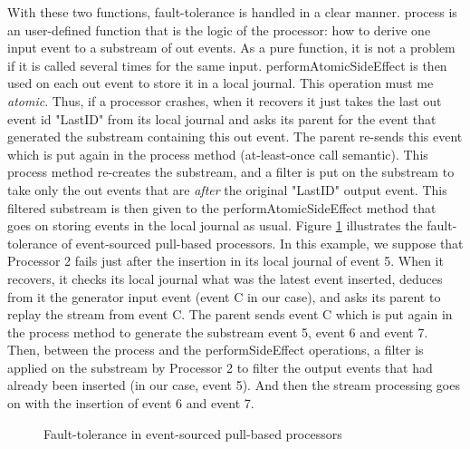 With these two functions, fault-tolerance is handled in a clear manner. process is an user-defined function that is the logic of the processor: how to derive one input event to a substream of out events. As a pure function, it is not a problem if it is called several times for the same input. performAtomicSideEffect is then used on each out event to
store it in a local journal. This operation must me \textit{atomic}. Thus, if a processor crashes, when it recovers it just takes the last out event id "LastID" from its local journal and asks its parent for the event that generated the substream containing this out event. The parent re-sends this event which is put again in the process method (at-least-once call semantic). This process method re-creates the substream, and a filter is put on the substream to take only the out events that are \textit{after} the original "LastID" output event. This
filtered substream is then given to the performAtomicSideEffect method that goes on storing events in the local journal as usual. Figure \ref{fig:pull_processors_tolerance} illustrates
the fault-tolerance of event-sourced pull-based processors. In this example, we suppose that Processor 2 fails just after the insertion in its local journal of event 5.
When it recovers, it checks its local journal what was the latest event inserted, deduces from it the generator input event (event C in our case), and asks its parent to replay the stream
from event C. The parent sends event C which is put again in the process method to generate the substream event 5, event 6 and event 7. Then, between the process and the performSideEffect operations, a filter is applied on the substream by Processor 2 to filter the output events that had already been inserted (in our case, event 5). And then the stream processing goes on with the insertion of event 6 and event 7.

\begin{figure}[h]
  \begin{center} 
    \caption{Fault-tolerance in event-sourced pull-based processors}
    \label{fig:pull_processors_tolerance}
  \end{center}
\end{figure}

